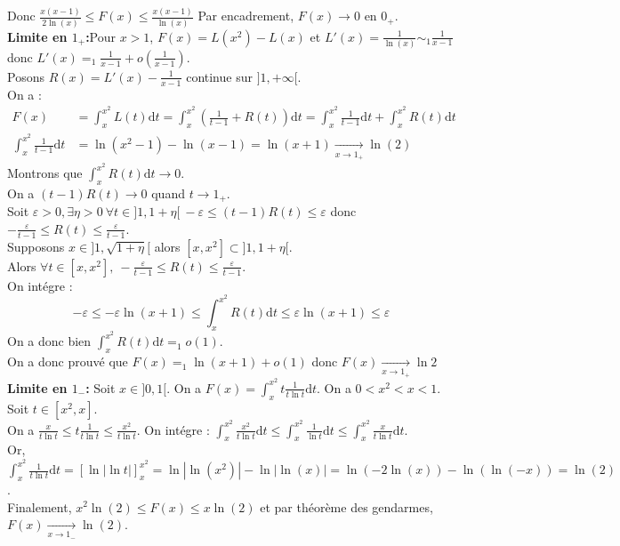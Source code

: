 \documentclass[11pt]{article}
\newcommand{\0}{\varnothing}
\newcommand*{\e}{\varepsilon}
\newcommand*{\n}{\\[0.2cm]}
\newcommand{\dt}{\textrm{d}t}
\begin{document}
\begin{ex}{}{}
\begin{equation*}
    \end{equation*}
    Donc $\frac{x(x-1)}{2\ln(x)} \leq F(x)\leq \frac{x(x-1)}{\ln(x)}$ Par encadrement, $F(x)\to0$ en $0_+$.\n
    \textbf{Limite en $1_+$:}Pour $x>1$, $F(x)=L(x^2)-L(x)$ et $L'(x)=\frac{1}{\ln(x)}\sim_1\frac{1}{x-1}$ donc $L'(x)=_1\frac{1}{x-1}+o(\frac{1}{x-1})$.\\
    Posons $R(x)=L'(x)-\frac{1}{x-1}$ continue sur $]1,+\infty[$.\\
    On a :
    \begin{align*}
        F(x)&=\int_x^{x^2}L(t)\dt=\int_x^{x^2}\left(\frac{1}{t-1}+R(t)\right)\dt=\int_x^{x^2}\frac{1}{t-1}\dt+\int_x^{x^2}R(t)\dt\\
        \int_x^{x^2}\frac{1}{t-1}\dt&=\ln(x^2-1)-\ln(x-1)=\ln(x+1)\xrightarrow[x\to1_+]{}\ln(2)
    \end{align*}
    Montrons que $\int_x^{x^2}R(t)\dt\to0$.\\
    On a $(t-1)R(t)\to0$ quand $t\to1_+$.\\
    Soit $\e>0, \exists\eta>0~\forall t\in]1,1+\eta[ ~ -\e\leq(t-1)R(t)\leq\e$ donc $-\frac{\e}{t-1}\leq R(t) \leq \frac{\e}{t-1}$.\\
    Supposons $x\in]1,\sqrt{1+\eta}[$ alors $[x,x^2]\subset]1,1+\eta[$.\\
    Alors $\forall t \in [x,x^2], ~ -\frac{\e}{t-1}\leq R(t) \leq \frac{\e}{t-1}$.\\
    On intégre :
    \begin{equation*}
        -\e\leq-\e\ln(x+1) \leq \int_x^{x^2}R(t)\dt\leq \e\ln(x+1)\leq\e
    \end{equation*}
    On a donc bien $\int_x^{x^2}R(t)\dt=_1o(1)$.\\
    On a donc prouvé que $F(x)=_1\ln(x+1)+o(1)$ donc $F(x)\xrightarrow[x\to1_+]{}\ln2$\n
    \textbf{Limite en $1_-$:} Soit $x\in]0,1[$. On a $F(x)=\int_x^{x^2}t\frac{1}{t\ln t}\dt$. On a $0<x^2<x<1$. Soit $t\in[x^2,x]$.\\
    On a $\frac{x}{t\ln t}\leq t\frac{1}{t\ln t}\leq \frac{x^2}{t\ln t}$. On intégre : $\int_x^{x^2}\frac{x^2}{t\ln t}\dt\leq\int_x^{x^2}\frac{1}{\ln t}\dt \leq \int_x^{x^2}\frac{x}{t\ln t}\dt$.\\
    Or, $\int_x^{x^2}\frac{1}{t\ln t}\dt = \left[ \ln | \ln t | \right]_x^{x^2}=\ln|\ln(x^2)|-\ln|\ln(x)|=\ln(-2\ln(x))-\ln(\ln(-x))=\ln(2)$.\\
    Finalement, $x^2\ln(2)\leq F(x) \leq x\ln(2)$ et par théorème des gendarmes, $F(x)\xrightarrow[x\to1_-]{}\ln(2)$.
\end{ex}
\end{document}
